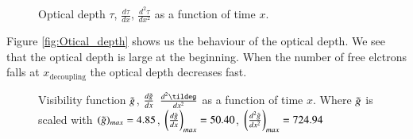 \documentclass{aa}
\begin{document}
\begin{figure}[H]
  \caption{Optical depth $\tau$, $\frac{d\tau}{dx}$, $\frac{d^2\tau}{dx^2}$ as a function of time $x$.}
  \label{fig:Otical_depth}
\end{figure}
Figure \eqref{fig:Otical_depth} shows us the behaviour of the optical depth. We see that the optical depth is large at the beginning. When the number of free elctrons falls at $x_\text{decoupling}$ the optical depth decreases fast. \\
\begin{figure}[H]
  \caption{Visibility function $\Tilde{g}$, $\frac{d\Tilde{g}}{dx}$ $\frac{d^2\tildeg}{dx^2}$ as a function of time $x$. Where $\Tilde{g}$ is scaled with $(\Tilde{g})_{max}=4.85$,  $\bigg(\frac{d\Tilde{g}}{dx}\bigg)_{max}=50.40$,  $\bigg(\frac{d^2\Tilde{g}}{dx^2}\bigg)_{max}=724.94$}
  \label{fig:Visibility function}
\end{figure}
\end{document}
